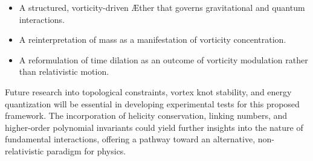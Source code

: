 \begin{itemize}
    \item A structured, vorticity-driven \AE ther that governs gravitational and quantum interactions.
    \item A reinterpretation of mass as a manifestation of vorticity concentration.
    \item A reformulation of time dilation as an outcome of vorticity modulation rather than relativistic motion.
\end{itemize}
Future research into topological constraints, vortex knot stability, and energy quantization will be essential in developing experimental tests for this proposed framework.
The incorporation of helicity conservation, linking numbers, and higher-order polynomial invariants could yield further insights into the nature of fundamental interactions, offering a pathway toward an alternative, non-relativistic paradigm for physics.